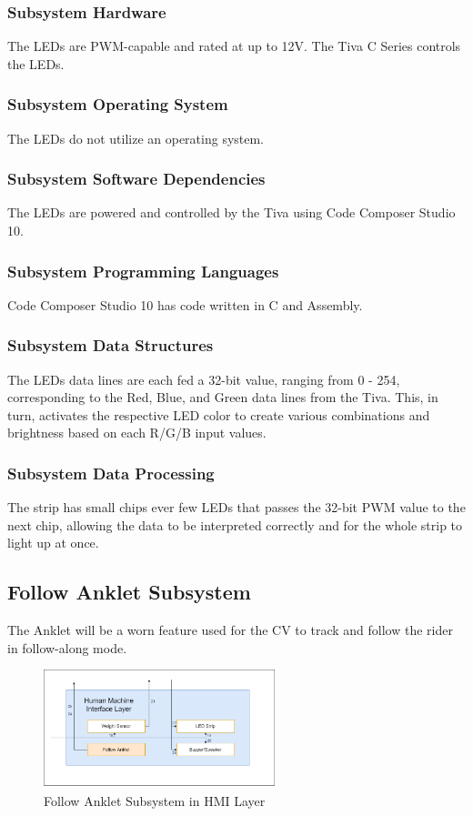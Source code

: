 \subsubsection{Subsystem Hardware}
The LEDs are PWM-capable and rated at up to 12V. The Tiva C Series controls the LEDs.

\subsubsection{Subsystem Operating System}
The LEDs do not utilize an operating system.

\subsubsection{Subsystem Software Dependencies}
The LEDs are powered and controlled by the Tiva using Code Composer Studio 10.

\subsubsection{Subsystem Programming Languages}
Code Composer Studio 10 has code written in C and Assembly.

\subsubsection{Subsystem Data Structures}
The LEDs data lines are each fed a 32-bit value, ranging from 0 - 254, corresponding to the Red, Blue, and Green data lines from the Tiva. This, in turn, activates the respective LED color to create various combinations and brightness based on each R/G/B input values.

\subsubsection{Subsystem Data Processing}
The strip has small chips ever few LEDs that passes the 32-bit PWM value to the next chip, allowing the data to be interpreted correctly and for the whole strip to light up at once.

\subsection{Follow Anklet Subsystem}
The Anklet will be a worn feature used for the CV to track and follow the rider in follow-along mode.

\begin{figure}[h!]
	\centering
 	\includegraphics[width=0.60\textwidth]{images/Kendall/Anklet.png}
 \caption{Follow Anklet Subsystem in HMI Layer}
\end{figure}

